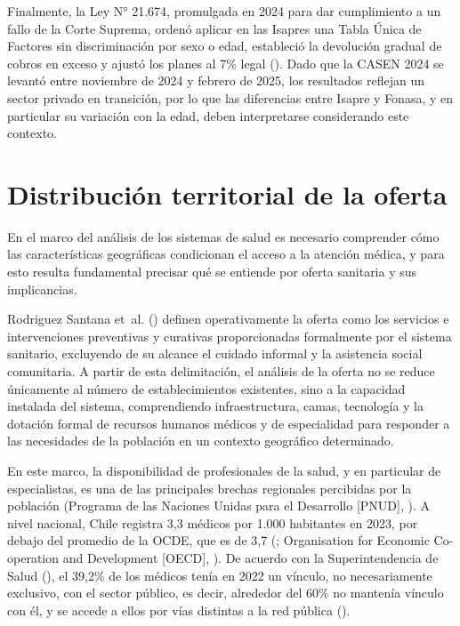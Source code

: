 \documentclass[
  spanish,
  a4paper,
  oneside]{scrbook}
\begin{document}
Finalmente, la Ley N° 21.674, promulgada en 2024 para dar cumplimiento a
un fallo de la Corte Suprema, ordenó aplicar en las Isapres una Tabla
Única de Factores sin discriminación por sexo o edad, estableció la
devolución gradual de cobros en exceso y ajustó los planes al 7\% legal
(). Dado que la
CASEN 2024 se levantó entre noviembre de 2024 y febrero de 2025, los
resultados reflejan un sector privado en transición, por lo que las
diferencias entre Isapre y Fonasa, y en particular su variación con la
edad, deben interpretarse considerando este contexto.

\section{Distribución territorial de la
oferta}\label{distribuciuxf3n-territorial-de-la-oferta}

En el marco del análisis de los sistemas de salud es necesario
comprender cómo las características geográficas condicionan el acceso a
la atención médica, y para esto resulta fundamental precisar qué se
entiende por oferta sanitaria y sus implicancias.

Rodriguez Santana et~al.
() definen operativamente
la oferta como los servicios e intervenciones preventivas y curativas
proporcionadas formalmente por el sistema sanitario, excluyendo de su
alcance el cuidado informal y la asistencia social comunitaria. A partir
de esta delimitación, el análisis de la oferta no se reduce únicamente
al número de establecimientos existentes, sino a la capacidad instalada
del sistema, comprendiendo infraestructura, camas, tecnología y la
dotación formal de recursos humanos médicos y de especialidad para
responder a las necesidades de la población en un contexto geográfico
determinado.

En este marco, la disponibilidad de profesionales de la salud, y en
particular de especialistas, es una de las principales brechas
regionales percibidas por la población (Programa de las Naciones Unidas
para el Desarrollo {[}PNUD{]},
). A nivel nacional, Chile
registra 3,3 médicos por 1.000 habitantes en 2023, por debajo del
promedio de la OCDE, que es de 3,7
(;
Organisation for Economic Co-operation and Development {[}OECD{]},
). De acuerdo con la
Superintendencia de Salud
(), el 39,2\%
de los médicos tenía en 2022 un vínculo, no necesariamente exclusivo,
con el sector público, es decir, alrededor del 60\% no mantenía vínculo
con él, y se accede a ellos por vías distintas a la red pública
().
\end{document}
